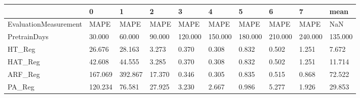 \begin{tabular}{llllllllll}
\toprule
{} &       0 &       1 &      2 &       3 &       4 &       5 &       6 &       7 &    mean \\
\midrule
EvaluationMeasurement &    MAPE &    MAPE &   MAPE &    MAPE &    MAPE &    MAPE &    MAPE &    MAPE &     NaN \\
PretrainDays          &  30.000 &  60.000 & 90.000 & 120.000 & 150.000 & 180.000 & 210.000 & 240.000 & 135.000 \\
HT\_Reg                &  26.676 &  28.163 &  3.273 &   0.370 &   0.308 &   0.832 &   0.502 &   1.251 &   7.672 \\
HAT\_Reg               &  42.608 &  44.555 &  3.285 &   0.370 &   0.308 &   0.832 &   0.502 &   1.251 &  11.714 \\
ARF\_Reg               & 167.069 & 392.867 & 17.370 &   0.346 &   0.305 &   0.835 &   0.515 &   0.868 &  72.522 \\
PA\_Reg                & 120.234 &  76.581 & 27.925 &   3.230 &   2.667 &   0.986 &   5.277 &   1.926 &  29.853 \\
\bottomrule
\end{tabular}

